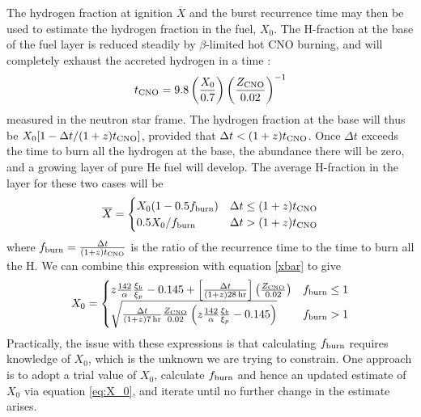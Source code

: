 \documentclass{aastex63}
\newcommand{\Xb}{\ensuremath{\overline{X}}}
\begin{document}
The hydrogen fraction at ignition $\Xb$ and the burst recurrence time may then be used to estimate the hydrogen fraction in the fuel, $X_0$. The H-fraction at the base of the fuel layer is reduced steadily by $\beta$-limited hot CNO burning, and will completely exhaust the accreted hydrogen in a time \cite[]{lampe16}:
\begin{equation}
t_{\rm CNO} =9.8\left(\frac{X_0}{0.7}\right) \left(\frac{Z_{\rm CNO}}{0.02}\right)^{-1}
\end{equation}
measured in the neutron star frame.
The hydrogen fraction at the base will thus be $X_0[1-\Delta t/(1+z)t_{\rm CNO}]$, 
%
provided that $\Delta t < (1+z)t_{\rm CNO}$. Once $\Delta t$ exceeds the time to burn all the hydrogen at the base, the abundance there will be zero, and a growing layer of pure He fuel will develop. The average H-fraction in the layer for these two cases will be 
\begin{equation}
\Xb = \begin{cases}
  X_0(1-0.5f_{\rm burn}) & \Delta t \leq (1+z)t_{\rm CNO} \\
  0.5X_0/f_{\rm burn} & \Delta t > (1+z)t_{\rm CNO}
  \end{cases}
\end{equation}
where $f_{\rm burn} = \frac{\Delta t}{(1+z)t_{\rm CNO}}$ is the ratio of the recurrence time to the time to burn all the H.
%
We can combine this expression with equation \ref{xbar} to give
\begin{equation}
X_0 = \begin{cases}
         z\frac{142}{\alpha}\frac{\xi_b}{\xi_p} - 0.145 
                           +\left[\frac{\Delta t}{(1+z)28\,{\rm hr}}\right]
                       \left(\frac{Z_{\rm CNO}}{0.02}\right) & f_{\rm burn} \leq 1\\
         \sqrt{ \frac{\Delta t}{(1+z)7\,{\rm hr}}\frac{Z_{\rm CNO}}{0.02}
                        \left(z\frac{142}{\alpha}\frac{\xi_b}{\xi_p} - 0.145\right) }
                        & f_{\rm burn} > 1
        \end{cases}
    \label{eq:X_0}
\end{equation}
Practically, the issue with these expressions is that calculating $f_{\rm burn}$ requires knowledge of $X_0$, which is the unknown we are trying to constrain. One approach is to adopt a trial value of $X_0$, calculate $f_{\rm burn}$ and hence an updated estimate of $X_0$ via equation \ref{eq:X_0}, and iterate until no further change in the estimate arises.
\end{document}

